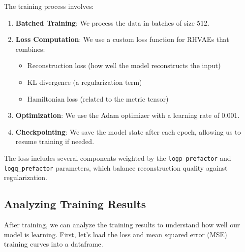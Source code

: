 \documentclass[
]{scrartcl}
\providecommand{\tightlist}{%
  \setlength{\itemsep}{0pt}\setlength{\parskip}{0pt}}\usepackage{longtable,booktabs,array}
\begin{document}
The training process involves:

\begin{enumerate}
\def\labelenumi{\arabic{enumi}.}
\tightlist
\item
  \textbf{Batched Training}: We process the data in batches of size 512.
\item
  \textbf{Loss Computation}: We use a custom loss function for RHVAEs
  that combines:

  \begin{itemize}
  \tightlist
  \item
    Reconstruction loss (how well the model reconstructs the input)
  \item
    KL divergence (a regularization term)
  \item
    Hamiltonian loss (related to the metric tensor)
  \end{itemize}
\item
  \textbf{Optimization}: We use the Adam optimizer with a learning rate
  of 0.001.
\item
  \textbf{Checkpointing}: We save the model state after each epoch,
  allowing us to resume training if needed.
\end{enumerate}

The loss includes several components weighted by the
\texttt{logp\_prefactor} and \texttt{logq\_prefactor} parameters, which
balance reconstruction quality against regularization.

\subsection{Analyzing Training
Results}\label{analyzing-training-results}

After training, we can analyze the training results to understand how
well our model is learning. First, let's load the loss and mean squared
error (MSE) training curves into a dataframe.
\end{document}
